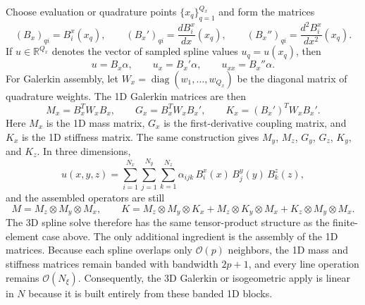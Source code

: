 \documentclass[11pt]{article}
\newcommand{\kron}{\otimes}
\newcommand{\R}{\mathbb{R}}
\newcommand{\diag}{\operatorname{diag}}
\newcommand{\bigO}{\mathcal{O}}
\newcommand{\Nall}{N}
\begin{document}
Choose evaluation or quadrature points $\{x_q\}_{q=1}^{Q_x}$ and
form the matrices
\[
  (B_x)_{qi} = B^x_i(x_q),
  \qquad
  (B_x')_{qi} = \frac{dB^x_i}{dx}(x_q),
  \qquad
  (B_x'')_{qi} = \frac{d^2 B^x_i}{dx^2}(x_q).
\]
If $u \in \R^{Q_x}$ denotes the vector of sampled spline values
$u_q = u(x_q)$, then
\begin{equation}
  u = B_x \alpha,
  \qquad
  u_x = B_x' \alpha,
  \qquad
  u_{xx} = B_x'' \alpha.
\end{equation}
For Galerkin assembly, let $W_x = \diag(w_1,\ldots,w_{Q_x})$ be the
diagonal matrix of quadrature weights.  The 1D Galerkin matrices are
then
\begin{equation}
  M_x = B_x^T W_x B_x,
  \qquad
  G_x = B_x^T W_x B_x',
  \qquad
  K_x = (B_x')^T W_x B_x'.
\end{equation}
Here $M_x$ is the 1D mass matrix, $G_x$ is the first-derivative
coupling matrix, and $K_x$ is the 1D stiffness matrix.  The same
construction gives $M_y$, $M_z$, $G_y$, $G_z$, $K_y$, and $K_z$.  In
three dimensions,
\begin{equation}
  u(x,y,z)
  = \sum_{i=1}^{N_x}\sum_{j=1}^{N_y}\sum_{k=1}^{N_z}
  \alpha_{ijk}\, B^x_i(x)\, B^y_j(y)\, B^z_k(z),
\end{equation}
and the assembled operators are still
\begin{equation}
  M = M_z \kron M_y \kron M_x,
  \qquad
  K = M_z \kron M_y \kron K_x
    + M_z \kron K_y \kron M_x
    + K_z \kron M_y \kron M_x.
\end{equation}
The 3D spline solve therefore has the same tensor-product structure as
the finite-element case above.  The only additional ingredient is the
assembly of the 1D matrices.  Because each spline overlaps only
$\bigO(p)$ neighbors, the 1D mass and stiffness matrices remain banded
with bandwidth $2p+1$, and every line operation remains
$\bigO(N_\xi)$.  Consequently, the 3D Galerkin or isogeometric apply is
linear in $\Nall$ because it is built entirely from these banded 1D
blocks.
\end{document}
